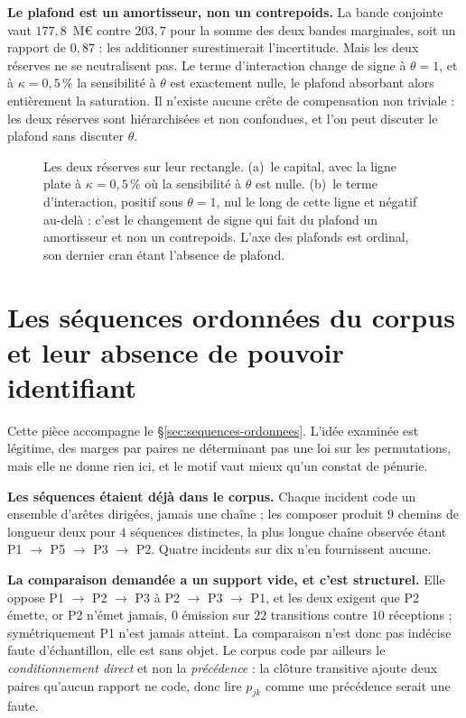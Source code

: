 \begin{cle}
\textbf{Le plafond est un amortisseur, non un contrepoids.} La bande conjointe vaut
$177{,}8$~M\euro{} contre $203{,}7$ pour la somme des deux bandes marginales, soit un rapport de
$0{,}87$ : les additionner surestimerait l'incertitude. Mais les deux réserves ne se neutralisent
pas. Le terme d'interaction change de signe à $\theta = 1$, et à $\kappa = 0{,}5\,\%$ la
sensibilité à $\theta$ est exactement nulle, le plafond absorbant alors entièrement la saturation.
Il n'existe aucune crête de compensation non triviale : les deux réserves sont hiérarchisées et non
confondues, et l'on peut discuter le plafond sans discuter $\theta$.
\end{cle}

\begin{figure}[htbp]\centering
{}
\caption{Les deux réserves sur leur rectangle. (a)~le capital, avec la ligne plate à
$\kappa = 0{,}5\,\%$ où la sensibilité à $\theta$ est nulle. (b)~le terme d'interaction, positif
sous $\theta = 1$, nul le long de cette ligne et négatif au-delà : c'est le changement de signe
qui fait du plafond un amortisseur et non un contrepoids. L'axe des plafonds est ordinal, son
dernier cran étant l'absence de plafond.}
\label{fig:plafond-saturation-3d}
\end{figure}

\section{Les séquences ordonnées du corpus et leur absence de pouvoir identifiant}
\label{sec:ann-sequences}

Cette pièce accompagne le \S\ref{sec:sequences-ordonnees}. L'idée examinée est légitime, des marges
par paires ne déterminant pas une loi sur les permutations, mais elle ne donne rien ici, et le
motif vaut mieux qu'un constat de pénurie.

\textbf{Les séquences étaient déjà dans le corpus.} Chaque incident code un ensemble d'arêtes
dirigées, jamais une chaîne ; les composer produit $9$ chemins de longueur deux pour $4$ séquences
distinctes, la plus longue chaîne observée étant P1 $\to$ P5 $\to$ P3 $\to$ P2. Quatre incidents
sur dix n'en fournissent aucune.

\textbf{La comparaison demandée a un support vide, et c'est structurel.} Elle oppose
P1 $\to$ P2 $\to$ P3 à P2 $\to$ P3 $\to$ P1, et les deux exigent que P2 émette, or P2 n'émet
jamais, $0$ émission sur $22$ transitions contre $10$ réceptions ; symétriquement P1 n'est jamais
atteint. La comparaison n'est donc pas indécise faute d'échantillon, elle est sans objet. Le corpus
code par ailleurs le \emph{conditionnement direct} et non la \emph{précédence} : la clôture
transitive ajoute deux paires qu'aucun rapport ne code, donc lire $p_{jk}$ comme une précédence
serait une faute.

